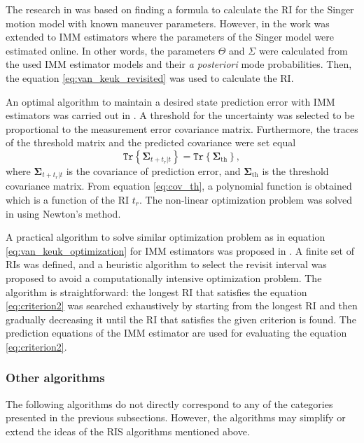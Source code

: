 \documentclass[english, 12pt, a4paper, elec, utf8, a-1b, online]{aaltothesis}
\numberwithin{equation}{section}
\renewcommand{\vec}[1]{\mathbf{#1}}
\newcommand{\tr}[1]{\texttt{Tr}\left\{ #1 \right\}}
\def\post{\textit{a posteriori}}
\newcommand{\ri}{t_r}
\begin{document}
The research in \cite{Keuk1975, vanKeuk1993} was based on finding a formula to calculate the RI for the Singer motion model with known maneuver parameters.
However, in \cite{Shin1995} the work was extended to IMM estimators where the parameters of the Singer model were estimated online.
In other words, the parameters $\Theta$ and $\Sigma$ were calculated from the used IMM estimator models and their \post{} mode probabilities.
Then, the equation \eqref{eq:van_keuk_revisited} was used to calculate the RI.

An optimal algorithm to maintain a desired state prediction error with IMM estimators was carried out in \cite{Watson1993}.
A threshold for the uncertainty was selected to be proportional to the measurement error covariance matrix.
Furthermore, the traces of the threshold matrix and the predicted covariance were set equal
\begin{equation}\label{eq:cov_th}
    \tr{ \vec{\Sigma}_{t+\ri|t} } = \tr{ \vec{\Sigma}_{\text{th}} },
\end{equation}
where $\vec{\Sigma}_{t+\ri|t}$ is the covariance of prediction error, and $\vec{\Sigma}_{\text{th}}$ is the threshold covariance matrix.
From equation \eqref{eq:cov_th}, a polynomial function is obtained which is a function of the RI $\ri$.
The non-linear optimization problem was solved in \cite{Watson1993} using Newton's method.

A practical algorithm to solve similar optimization problem as in equation \eqref{eq:van_keuk_optimization} for IMM estimators was proposed in \cite{Daeipour1994}. A finite set of RIs was defined, and a heuristic algorithm to select the revisit interval was proposed to avoid a computationally intensive optimization problem.
The algorithm is straightforward: the longest RI that satisfies the equation \eqref{eq:criterion2} was searched exhaustively by starting from the longest RI and then gradually decreasing it until the RI that satisfies the given criterion is found. 
The prediction equations of the IMM estimator are used for evaluating the equation \eqref{eq:criterion2}.

\subsubsection{Other algorithms}

The following algorithms do not directly correspond to any of the categories presented in the previous subsections.
However, the algorithms may simplify or extend the ideas of the RIS algorithms mentioned above.
\end{document}
